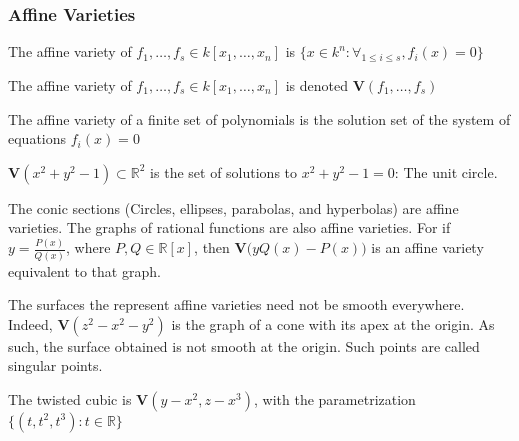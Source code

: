 \documentclass[crop=false,class=book,oneside]{standalone}
\begin{document}
            \subsubsection{Affine Varieties}
                \begin{definition}
                    The affine variety of
                    $f_{1},\hdots,f_{s}\in{k}[x_{1},\hdots,x_{n}]$
                    is
                    $\{x\in{k^{n}}:\forall_{1\leq{i}\leq{s}},f_i(x)=0\}$
                \end{definition}
                \begin{notation}
                    The affine variety of
                    $f_{1},\hdots,f_{s}\in k[x_{1},\hdots,x_{n}]$
                    is denoted $\mathbf{V}(f_1,\hdots, f_s)$
                \end{notation}
                The affine variety of a finite set of
                polynomials is the solution set of the
                system of equations $f_{i}(x)=0$
                \begin{example}
                    $\mathbf{V}(x^2+y^2-1)\subset\mathbb{R}^2$
                    is the set of solutions to $x^2+y^2-1 = 0$: The unit circle.
                \end{example}
                \begin{example}
                    The conic sections
                    (Circles, ellipses, parabolas, and hyperbolas)
                    are affine varieties. The graphs of rational
                    functions are also affine varieties.
                    For if $y = \frac{P(x)}{Q(x)}$, where
                    $P,Q\in \mathbb{R}[x]$, then
                    $\mathbf{V}\big(yQ(x)-P(x)\big)$ is an
                    affine variety equivalent to that graph.
                \end{example}
                \begin{example}
                    The surfaces the represent affine varieties
                    need not be smooth everywhere. Indeed,
                    $\mathbf{V}(z^2-x^2-y^2)$ is the graph of a cone
                    with its apex at the origin. As such, the surface
                    obtained is not smooth at the origin. Such points
                    are called singular points.
                \end{example}
                \begin{example}
                    The twisted cubic is $\mathbf{V}(y-x^2,z-x^3)$,
                    with the parametrization $\{(t,t^2,t^3):t\in\mathbb{R}\}$
                \end{example}
\end{document}
